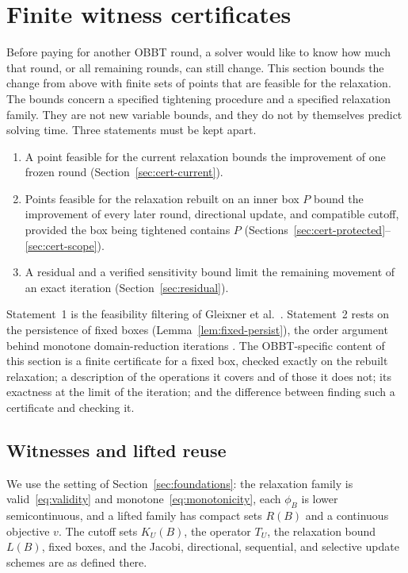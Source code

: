 \section{Finite witness certificates}\label{sec:certificates}

Before paying for another OBBT round, a solver would like to know how much
that round, or all remaining rounds, can still change. This section bounds
the change from above with finite sets of points that are feasible for the
relaxation. The bounds concern a specified tightening procedure and a
specified relaxation family. They are not new variable bounds, and they do
not by themselves predict solving time. Three statements must be kept apart.
\begin{enumerate}
\item A point feasible for the current relaxation bounds the improvement
  of one frozen round (Section~\ref{sec:cert-current}).
\item Points feasible for the relaxation rebuilt on an inner box $P$ bound
  the improvement of every later round, directional update, and compatible
  cutoff, provided the box being tightened contains $P$
  (Sections~\ref{sec:cert-protected}--\ref{sec:cert-scope}).
\item A residual and a verified sensitivity bound limit the remaining
  movement of an exact iteration (Section~\ref{sec:residual}).
\end{enumerate}
Statement~1 is the feasibility filtering of Gleixner et
al.~\cite{gleixner2017-three-enhancements-for-optimization-based}.
Statement~2 rests on the persistence of fixed boxes
(Lemma~\ref{lem:fixed-persist}), the order argument behind monotone
domain-reduction iterations
\cite{tarski1955fixpoint,caprara2010-global-optimization-problems-and-domain}.
The OBBT-specific content of this section is a finite certificate for a
fixed box, checked exactly on the rebuilt relaxation; a description of the
operations it covers and of those it does not; its exactness at the limit
of the iteration; and the difference between finding such a certificate
and checking it.

\subsection{Witnesses and lifted reuse}\label{sec:cert-setting}

We use the setting of Section~\ref{sec:foundations}: the relaxation family
is valid~\eqref{eq:validity} and monotone~\eqref{eq:monotonicity}, each
$\phi_B$ is lower semicontinuous, and a lifted family has compact sets
$R(B)$ and a continuous objective $v$. The cutoff sets $K_U(B)$, the
operator $T_U$, the relaxation bound $L(B)$, fixed boxes, and the Jacobi,
directional, sequential, and selective update schemes are as defined
there.

